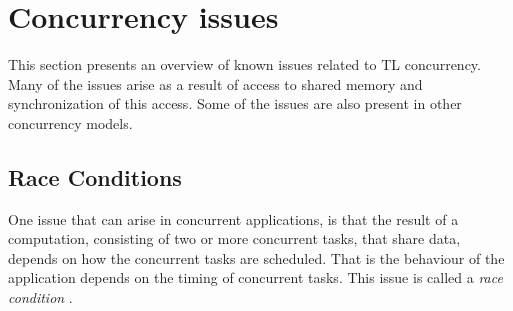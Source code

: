 \section{Concurrency issues}
This section presents an overview of known issues related to \ac{TL} concurrency. Many of the issues arise as a result of access to shared memory and synchronization of this access. Some of the issues are also present in other concurrency models.

\subsection{Race Conditions}\label{subsec:race_coditions}
One issue that can arise in concurrent applications, is that the result of a computation, consisting of two or more concurrent tasks, that share data, depends on how the concurrent tasks are scheduled. That is the behaviour of the application depends on the timing of concurrent tasks. This issue is called a \emph{race condition}
\cite[p. 983]{bryant2011computer}\cite[p. 115]{tanenbaum2008modern}\cite[p. 44]{sevenModels}. 

